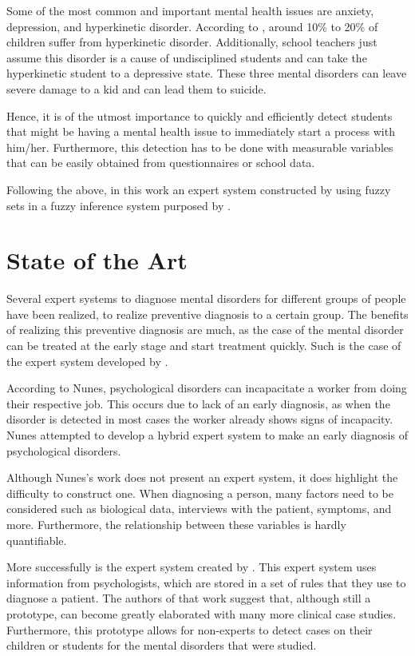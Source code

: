 \documentclass[conference]{IEEEtran}
\theoremstyle{definition}
\theoremstyle{remark}
\theoremstyle{remark}
\begin{document}
Some of the most common and important mental health issues are anxiety,
depression, and hyperkinetic disorder. According to \textcite{schulte2016}, around
10\% to 20\% of children suffer from hyperkinetic disorder. Additionally, school
teachers just assume this disorder is a cause of undisciplined students and can
take the hyperkinetic student to a depressive state. These three mental
disorders can leave severe damage to a kid and can lead them to suicide.

Hence, it is of the utmost importance to quickly and efficiently detect students
that might be having a mental health issue to immediately start a process with
him/her. Furthermore, this detection has to be done with measurable variables
that can be easily obtained from questionnaires or school data.

Following the above, in this work an expert system constructed by using fuzzy
sets \parencite{zadeh1965} in a fuzzy inference system purposed by
\textcite{mamdani1981}.

\section{State of the Art}
Several expert systems to diagnose mental disorders for different groups of
people have been realized, to realize preventive diagnosis to a certain group.
The benefits of realizing this preventive diagnosis are much, as the case of the
mental disorder can be treated at the early stage and start treatment quickly.
Such is the case of the expert system developed by \textcite{nunes2009}.

According to Nunes, psychological disorders can incapacitate a worker from doing
their respective job. This occurs due to lack of an early diagnosis, as when the
disorder is detected in most cases the worker already shows signs of incapacity.
Nunes attempted to develop a hybrid expert system to make an early diagnosis of
psychological disorders.

Although Nunes's work does not present an expert system, it does highlight the
difficulty to construct one. When diagnosing a person, many factors need to be
considered such as biological data, interviews with the patient, symptoms, and
more. Furthermore, the relationship between these variables is hardly
quantifiable.

More successfully is the expert system created by \textcite{kim2006}. This
expert system uses information from psychologists, which are stored in a set of
rules that they use to diagnose a patient. The authors of that work suggest
that, although still a prototype, can become greatly elaborated with many more
clinical case studies. Furthermore, this prototype allows for non-experts to
detect cases on their children or students for the mental disorders that were
studied.
\end{document}
